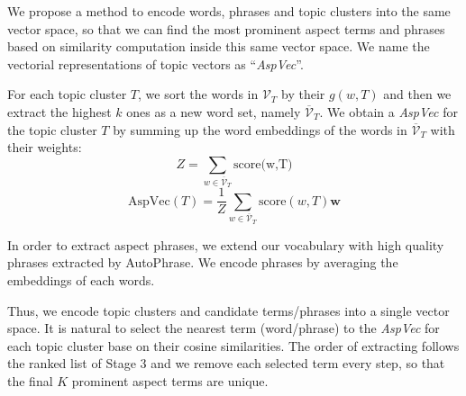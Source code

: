 We propose a method to encode words, phrases and topic clusters into the same vector space, so that we can find the most prominent aspect terms and phrases based on similarity computation inside this same vector space.
We name the vectorial representations of topic vectors as ``\textit{AspVec}''.

For each topic cluster $T$, we sort the words in $\mathcal{V}_T$ by their $g(w,T)$ and then we extract the highest $k$ ones as a new word set, namely $\overline{\mathcal{V}}_T$.
We obtain a \textit{AspVec} for the topic cluster $T$ by summing up the word embeddings of the words in $\overline{\mathcal{V}}_T$ with their weights: 
\begin{equation}
Z = \sum_{w\in \overline{\mathcal{V}}_T} \text{score(w,T)}
\end{equation}
\begin{equation}
\text{AspVec}(T) = \frac{1}{Z} {\sum_{w\in \overline{\mathcal{V}}_T} {\text{score}(w,T) \mathbf{w}}}
\end{equation}

In order to extract aspect phrases, we extend our vocabulary with high quality phrases extracted by AutoPhrase\cite{liu2017phrase}. 
We encode phrases by averaging the embeddings of each words.  

Thus, we encode topic clusters and candidate terms/phrases into a single vector space. 
It is natural to select the nearest term (word/phrase) to the \textit{AspVec} for each topic cluster base on their cosine similarities.
The order of extracting follows the ranked list of Stage 3 and 
we remove each selected term every step, so 
that the final $K$ prominent aspect terms are unique. 

